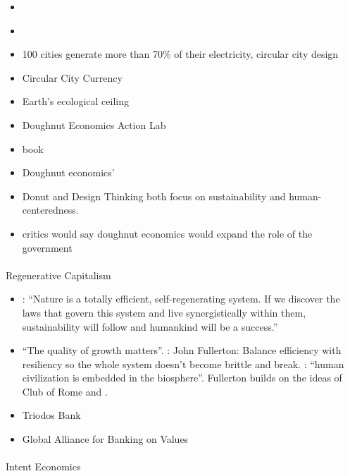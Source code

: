 \documentclass[
  letterpaper,
  DIV=11,
  numbers=noendperiod]{scrartcl}
\makeatletter
\let\oldparagraph\paragraph
\renewcommand{\paragraph}{
    \@ifstar
      \xxxParagraphStar
      \xxxParagraphNoStar
  }
\newcommand{\xxxParagraphStar}[1]{\oldparagraph*{#1}\mbox{}}
\newcommand{\xxxParagraphNoStar}[1]{\oldparagraph{#1}\mbox{}}
\makeatother
\begin{document}
\begin{itemize}
\item
  \citet{AmsterdamUses2023}
\item
  \citet{wetenschappelijkbureaugroenlinksKateRaworthDoughnut2023}
\item
  100 cities generate more than 70\% of their electricity, circular city
  design
\item
  Circular City Currency
\item
  Earth's ecological ceiling
\item
  Doughnut Economics Action Lab
\item
  \citet{raworthDoughnutEconomicsSeven2017} book
\item
  Doughnut economics' \citet{bbcreelHowDutchAre2020}
\item
  Donut and Design Thinking both focus on sustainability and
  human-centeredness.
\item
  \citet{horwitzThereHoleMiddle2017} critics would say doughnut
  economics would expand the role of the government
\end{itemize}

\paragraph{Regenerative Capitalism}\label{regenerative-capitalism}

\begin{itemize}
\item
  \citet{fullerGrunchGiants1983}: ``Nature is a totally efficient,
  self-regenerating system. If we discover the laws that govern this
  system and live synergistically within them, sustainability will
  follow and humankind will be a success.''
\item
  \citet{RegenerativeCapitalismNew2023} ``The quality of growth
  matters''. \citet{johnfullertonJohnFullertonWhen2011}: John Fullerton:
  Balance efficiency with resiliency so the whole system doesn't become
  brittle and break. \citet{johnfullertonRegenerativeBusinessPart2022}:
  ``human civilization is embedded in the biosphere''. Fullerton builds
  on the ideas of Club of Rome and
  \citet{meadowsLimitsGrowthReport1972}.
\item
  Triodos Bank
\item
  Global Alliance for Banking on Values
\end{itemize}

\paragraph{Intent Economics}\label{intent-economics}
\end{document}
